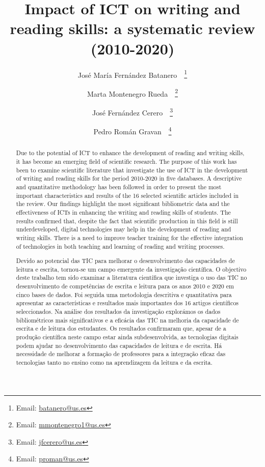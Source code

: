 \documentclass{textolivre}
\title{Impact of ICT on writing and reading skills: a systematic review (2010-2020)}
\author[1]{José María Fernández Batanero~\orcid{0000-0003-4097-5382}~\thanks{Email: \url{batanero@us.es}}}
\author[1]{Marta Montenegro Rueda~\orcid{0000-0003-4733-289X}~\thanks{Email: \url{mmontenegro1@us.es}}}
\author[1]{José Fernández Cerero~\orcid{0000-0002-2745-6986}~\thanks{Email: \url{jfcerero@us.es}}}
\author[1]{Pedro Román Gravan~\orcid{0000-0002-1646-9247}~\thanks{Email: \url{proman@us.es}}}
\affil[1]{Universidad de Sevilla, Facultad de Ciencias de la Educación, Departamento de Didáctica y Organización Educativa, Sevilla, España.}
\begin{document}
\maketitle

\begin{polyabstract}
\begin{abstract}
Due to the potential of ICT to enhance the development of reading and writing skills, it has become an emerging field of scientific research. The purpose of this work has been to examine scientific literature that investigate the use of ICT in the development of writing and reading skills for the period 2010-2020 in five databases. A descriptive and quantitative methodology has been followed in order to present the most important characteristics and results of the 16 selected scientific articles included in the review. Our findings highlight the most significant bibliometric data and the effectiveness of ICTs in enhancing the writing and reading skills of students. The results confirmed that, despite the fact that scientific production in this field is still underdeveloped, digital technologies may help in the development of reading and writing skills. There is a need to improve teacher training for the effective integration of technologies in both teaching and learning of reading and writing processes.

\end{abstract}

\begin{portuguese}
\begin{abstract}
Devido ao potencial das TIC para melhorar o desenvolvimento das capacidades de leitura e escrita, tornou-se um campo emergente da investigação científica. O objectivo deste trabalho tem sido examinar a literatura científica que investiga o uso das TIC no desenvolvimento de competências de escrita e leitura para os anos 2010 e 2020 em cinco bases de dados. Foi seguida uma metodologia descritiva e quantitativa para apresentar as características e resultados mais importantes dos 16 artigos científicos seleccionados. Na análise dos resultados da investigação explorámos os dados bibliométricos mais significativos e a eficácia das TIC na melhoria da capacidade de escrita e de leitura dos estudantes. Os resultados confirmaram que, apesar de a produção científica neste campo estar ainda subdesenvolvida, as tecnologias digitais podem ajudar no desenvolvimento das capacidades de leitura e de escrita. Há necessidade de melhorar a formação de professores para a integração eficaz das tecnologias tanto no ensino como na aprendizagem da leitura e da escrita.

\end{abstract}
\end{portuguese}

\end{polyabstract}
\end{document}
